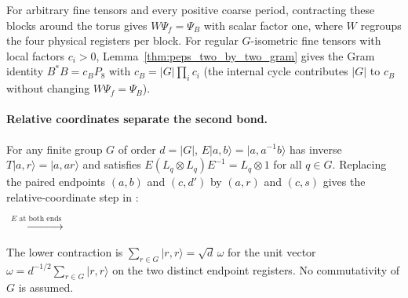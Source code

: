 For arbitrary fine tensors and every positive coarse period, contracting
these blocks around the torus gives $W\Psi_f=\Psi_B$ with scalar factor one,
where $W$ regroups the four physical registers per block. For
regular $G$-isometric fine tensors with local factors $c_i>0$,
Lemma~\ref{thm:peps_two_by_two_gram} gives the Gram identity
$B^*B=c_BP_8$ with $c_B=|G|\prod_i c_i$ (the internal cycle contributes
$|G|$ to $c_B$ without changing $W\Psi_f=\Psi_B$).

\paragraph{Relative coordinates separate the second bond.}
For any finite group $G$ of order $d=|G|$, $E|a,b\rangle=|a,a^{-1}b\rangle$
has inverse $T|a,r\rangle=|a,ar\rangle$ and satisfies
$E(L_q\otimes L_q)E^{-1}=L_q\otimes1$ for all $q\in G$. Replacing the
paired endpoints $(a,b)$ and $(c,d')$ by $(a,r)$ and $(c,s)$ gives the
relative-coordinate step in \cite[Observation~6.5]{Schuch2010PEPS}:
\begin{tenkzequation}
    \tenkzkernel
    \begin{tenkz}[rows={wire,wire,wire}, cols=1, bonds=none]
    \end{tenkz}
    $\xrightarrow{\ E\text{ at both ends}\ }$
    \begin{tenkz}[rows={wire,wire,wire}, cols=2, bonds=none]
    \end{tenkz}
\end{tenkzequation}
The lower contraction is $\sum_{r\in G}|r,r\rangle=\sqrt d\,\omega$ for
the unit vector $\omega=d^{-1/2}\sum_{r\in G}|r,r\rangle$ on the two
distinct endpoint registers. No commutativity of $G$ is assumed.

